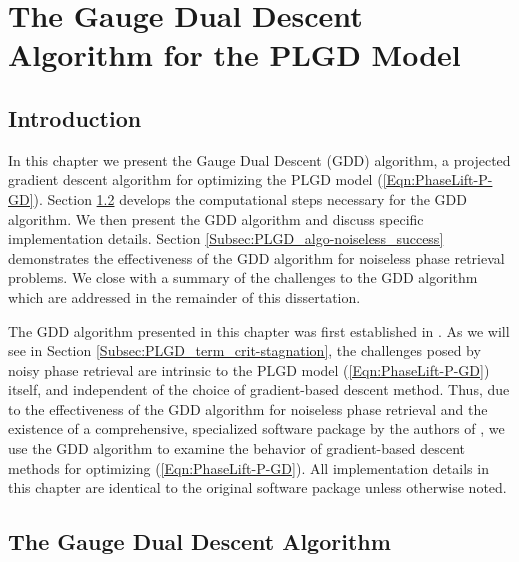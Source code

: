 \chapter{The Gauge Dual Descent Algorithm for the PLGD Model}  \label{Sec:PLGD_algo}



\section{Introduction}		\label{Subsec:PLGD_algo-intro}


In this chapter we present the Gauge Dual Descent (GDD) algorithm, a projected gradient descent algorithm for optimizing the PLGD model (\ref{Eqn:PhaseLift-P-GD}).  Section \ref{Subsec:PLGD_algo-algo} develops the computational steps necessary for the GDD algorithm.  We then present the GDD algorithm and discuss specific implementation details.  Section \ref{Subsec:PLGD_algo-noiseless_success} demonstrates the effectiveness of the GDD algorithm for noiseless phase retrieval problems.  We close with a summary of the challenges to the GDD algorithm which are addressed in the remainder of this dissertation.

The GDD algorithm presented in this chapter was first established in \cite{DBLP:journals/siamsc/FriedlanderM16}.  
As we will see in Section \ref{Subsec:PLGD_term_crit-stagnation}, the challenges posed by noisy phase retrieval are intrinsic to the PLGD model (\ref{Eqn:PhaseLift-P-GD}) itself, and independent of the choice of gradient-based descent method.  
Thus, due to the effectiveness of the GDD algorithm for noiseless phase retrieval and the existence of a comprehensive, specialized software package by the authors of \cite{DBLP:journals/siamsc/FriedlanderM16}, we use the GDD algorithm to examine the behavior of gradient-based descent methods for optimizing (\ref{Eqn:PhaseLift-P-GD}).  
All implementation details in this chapter are identical to the original software package unless otherwise noted.





\section{The Gauge Dual Descent Algorithm}  	\label{Subsec:PLGD_algo-algo}



